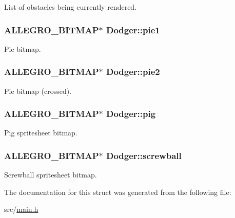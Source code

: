 List of obstacles being currently rendered. \hypertarget{structDodger_a4f7d7343cac6f73d52ad090f3a6a19c3}{
\subsubsection[{pie1}]{\setlength{\rightskip}{0pt plus 5cm}A\-L\-L\-E\-G\-R\-O\-\_\-\-B\-I\-T\-M\-A\-P$\ast$ Dodger\-::pie1}}\label{structDodger_a4f7d7343cac6f73d52ad090f3a6a19c3}
Pie bitmap. \hypertarget{structDodger_a10322a7b25a6622f22dbde738d58151c}{
\subsubsection[{pie2}]{\setlength{\rightskip}{0pt plus 5cm}A\-L\-L\-E\-G\-R\-O\-\_\-\-B\-I\-T\-M\-A\-P$\ast$ Dodger\-::pie2}}\label{structDodger_a10322a7b25a6622f22dbde738d58151c}
Pie bitmap (crossed). \hypertarget{structDodger_a940e169cb64d0cd3d3a532e9b54ab4a0}{
\subsubsection[{pig}]{\setlength{\rightskip}{0pt plus 5cm}A\-L\-L\-E\-G\-R\-O\-\_\-\-B\-I\-T\-M\-A\-P$\ast$ Dodger\-::pig}}\label{structDodger_a940e169cb64d0cd3d3a532e9b54ab4a0}
Pig spritesheet bitmap. \hypertarget{structDodger_a703df249c4b1572717c221aa48588df3}{
\subsubsection[{screwball}]{\setlength{\rightskip}{0pt plus 5cm}A\-L\-L\-E\-G\-R\-O\-\_\-\-B\-I\-T\-M\-A\-P$\ast$ Dodger\-::screwball}}\label{structDodger_a703df249c4b1572717c221aa48588df3}
Screwball spritesheet bitmap. 

The documentation for this struct was generated from the following file\-:\begin{DoxyCompactItemize}
\item 
src/\hyperlink{main_8h}{main.\-h}\end{DoxyCompactItemize}
